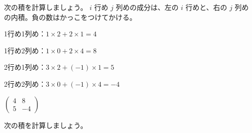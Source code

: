 \begin{reidai}
次の積を計算しましょう。
\kangaekata $i$ 行め $j$ 列めの成分は、左の $i$ 行めと、右の $j$ 列めの内積。負の数はかっこをつけてかける。\par
\shiki\kviids{}\zw{} 1行め1列め：$1\times2+2\times1=4$\par
\kviida 1行め2列め：$1\times0+2\times4=8$\par
\kviida 2行め1列め：$3\times2+(-1)\times1=5$\par
\kviida 2行め2列め：$3\times0+(-1)\times4=-4$\par
\kotae\kviids{}\zw{} $\begin{pmatrix}4&8\\5&-4\end{pmatrix}$
\end{reidai}

\begin{jibun}
次の積を計算しましょう。
\end{jibun}

